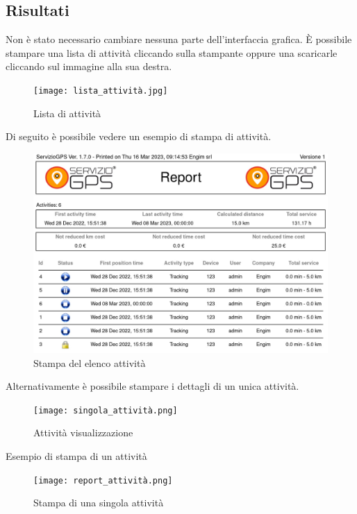 \documentclass[12pt]{article}
\begin{document}
\subsection{Risultati}
Non è stato necessario cambiare nessuna parte dell'interfaccia grafica. È possibile 
stampare una lista di attività cliccando sulla stampante oppure una scaricarle 
cliccando sul immagine alla sua destra.
\begin{figure}[H]
\texttt{[image: lista\_attività.jpg]}
\caption{Lista di attività}
\label{fig:mesh3}
\end{figure}
Di seguito è possibile vedere un esempio di stampa di attività. 
\begin{figure}[H]
\includegraphics[width =\textwidth]{report.png}
\caption{Stampa del elenco attività}
\label{fig:mesh4}
\end{figure}

Alternativamente è possibile stampare i dettagli di un unica attività.
\begin{figure}[H]
\texttt{[image: singola\_attività.png]}
\caption{Attività visualizzazione}
\label{fig:mesh5}
\end{figure}
Esempio di stampa di un attività 
\begin{figure}[H]
\texttt{[image: report\_attività.png]}
\caption{Stampa di una singola attività}
\label{fig:mesh6}
\end{figure}
\end{document}
